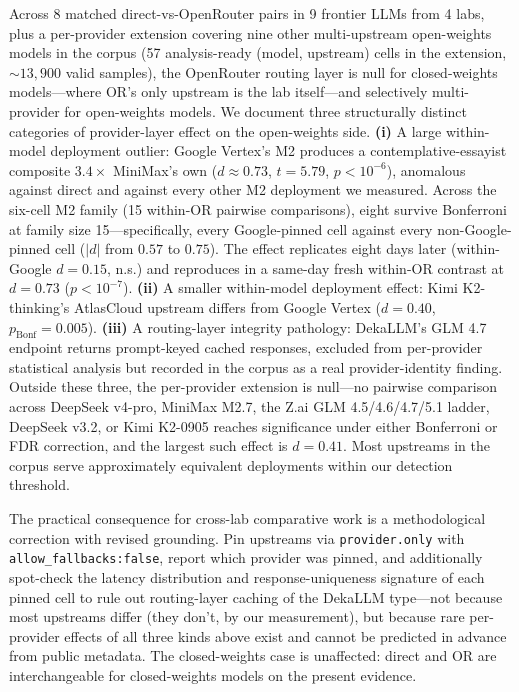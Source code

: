 \documentclass[11pt,a4paper]{article}
\begin{document}
Across 8 matched direct-vs-OpenRouter pairs in 9 frontier LLMs from 4 labs, plus a per-provider extension covering nine other multi-upstream open-weights models in the corpus (57 analysis-ready (model, upstream) cells in the extension, $\sim 13{,}900$ valid samples), the OpenRouter routing layer is null for closed-weights models---where OR's only upstream is the lab itself---and selectively multi-provider for open-weights models. We document three structurally distinct categories of provider-layer effect on the open-weights side. \textbf{(i)} A large within-model deployment outlier: Google Vertex's M2 produces a contemplative-essayist composite $3.4\times$ MiniMax's own ($d \approx 0.73$, $t{=}5.79$, $p<10^{-6}$), anomalous against direct and against every other M2 deployment we measured. Across the six-cell M2 family (15 within-OR pairwise comparisons), eight survive Bonferroni at family size 15---specifically, every Google-pinned cell against every non-Google-pinned cell ($|d|$ from $0.57$ to $0.75$). The effect replicates eight days later (within-Google $d{=}0.15$, n.s.) and reproduces in a same-day fresh within-OR contrast at $d{=}0.73$ ($p<10^{-7}$). \textbf{(ii)} A smaller within-model deployment effect: Kimi K2-thinking's AtlasCloud upstream differs from Google Vertex ($d{=}0.40$, $p_\text{Bonf}{=}0.005$). \textbf{(iii)} A routing-layer integrity pathology: DekaLLM's GLM 4.7 endpoint returns prompt-keyed cached responses, excluded from per-provider statistical analysis but recorded in the corpus as a real provider-identity finding. Outside these three, the per-provider extension is null---no pairwise comparison across DeepSeek v4-pro, MiniMax M2.7, the Z.ai GLM 4.5/4.6/4.7/5.1 ladder, DeepSeek v3.2, or Kimi K2-0905 reaches significance under either Bonferroni or FDR correction, and the largest such effect is $d{=}0.41$. Most upstreams in the corpus serve approximately equivalent deployments within our detection threshold.

The practical consequence for cross-lab comparative work is a methodological correction with revised grounding. Pin upstreams via \texttt{provider.only} with \texttt{allow\_fallbacks:false}, report which provider was pinned, and additionally spot-check the latency distribution and response-uniqueness signature of each pinned cell to rule out routing-layer caching of the DekaLLM type---not because most upstreams differ (they don't, by our measurement), but because rare per-provider effects of all three kinds above exist and cannot be predicted in advance from public metadata. The closed-weights case is unaffected: direct and OR are interchangeable for closed-weights models on the present evidence.
\end{document}
